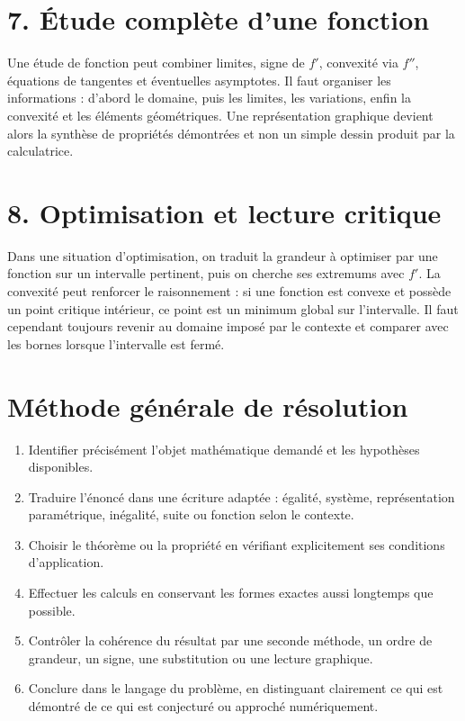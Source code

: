 \section{7. Étude complète d’une fonction}
Une étude de fonction peut combiner limites, signe de $f'$, convexité via $f''$, équations de tangentes et éventuelles asymptotes. Il faut organiser les informations : d'abord le domaine, puis les limites, les variations, enfin la convexité et les éléments géométriques. Une représentation graphique devient alors la synthèse de propriétés démontrées et non un simple dessin produit par la calculatrice.

\section{8. Optimisation et lecture critique}
Dans une situation d'optimisation, on traduit la grandeur à optimiser par une fonction sur un intervalle pertinent, puis on cherche ses extremums avec $f'$. La convexité peut renforcer le raisonnement : si une fonction est convexe et possède un point critique intérieur, ce point est un minimum global sur l'intervalle. Il faut cependant toujours revenir au domaine imposé par le contexte et comparer avec les bornes lorsque l'intervalle est fermé.


\section{Méthode générale de résolution}
\begin{methode}
\begin{enumerate}
\item Identifier précisément l'objet mathématique demandé et les hypothèses disponibles.
\item Traduire l'énoncé dans une écriture adaptée : égalité, système, représentation paramétrique, inégalité, suite ou fonction selon le contexte.
\item Choisir le théorème ou la propriété en vérifiant explicitement ses conditions d'application.
\item Effectuer les calculs en conservant les formes exactes aussi longtemps que possible.
\item Contrôler la cohérence du résultat par une seconde méthode, un ordre de grandeur, un signe, une substitution ou une lecture graphique.
\item Conclure dans le langage du problème, en distinguant clairement ce qui est démontré de ce qui est conjecturé ou approché numériquement.
\end{enumerate}
\end{methode}

